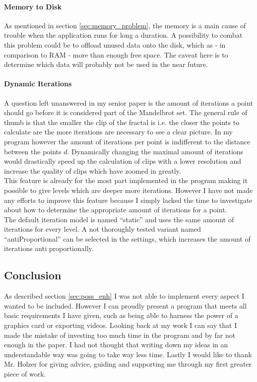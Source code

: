 \documentclass[10pt,a4paper,titlepage]{article}
\begin{document}
	\paragraph{Memory to Disk}
	As mentioned in section \ref{sec:memory_problem}, the memory is a main cause of trouble when the application runs for long a duration. A possibility to combat this problem could be to offload unused data onto the disk, which as - in comparison to RAM - more than enough free space. The caveat here is to determine which data will probably not be used in the near future.
	\paragraph{Dynamic Iterations}
	A question left unanswered in my senior paper is the amount of iterations a point should go before it is considered part of the Mandelbrot set. The general rule of thumb is that the smaller the clip of the fractal is i.e. the closer the points to calculate are the more iterations are necessary to see a clear picture. In my program however the amount of iterations per point is indifferent to the distance between the points \(d\). Dynamically changing the maximal amount of iterations would drastically speed up the calculation of clips with a lower resolution and increase the quality of clips which have zoomed in greatly.\\
	This feature is already for the most part implemented in the program making it possible to give levels which are deeper more iterations. However I have not made any efforts to improve this feature because I simply lacked the time to investigate about how to determine the appropriate amount of iterations for a point.\\
	The default iteration model is named ``static'' and uses the same amount of iterations for every level. A not thoroughly tested variant named ``antiProportional'' can be selected in the settings, which increases the amount of iterations anti proportionally.
	\subsection{Conclusion}
	As described section \ref{sec:poss_enh} I was not able to implement every aspect I wanted to be included. However I can proudly present a program that meets all basic requirements I have given, such as being able to harness the power of a graphics card or exporting videos. Looking back at my work I can say that I made the mistake of investing too much time in the program and by far not enough in the paper. I had not thought that writing down my ideas in an understandable way was going to take way less time. Lastly I would like to thank Mr. Holzer for giving advice, guiding and supporting me through my first greater piece of work.
	\clearpage
	\printbibliography
	
\end{document}
